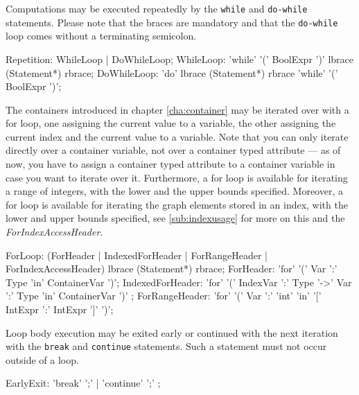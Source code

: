 Computations may be executed repeatedly by the \texttt{while} and \texttt{do-while} statements. Please note that the braces are mandatory and that the \texttt{do-while} loop comes without a terminating semicolon.

\begin{rail} 
  Repetition: WhileLoop | DoWhileLoop;
	WhileLoop: 'while' '(' BoolExpr ')' lbrace (Statement*) rbrace;
	DoWhileLoop: 'do' lbrace (Statement*) rbrace 'while' '(' BoolExpr ')';
\end{rail}


The containers introduced in chapter \ref{cha:container} may be iterated over with a for loop, one assigning the current value to a variable, the other assigning the current index and the current value to a variable.
Note that you can only iterate directly over a container variable, not over a container typed attribute --- as of now, you have to assign a container typed attribute to a container variable in case you want to iterate over it.
Furthermore, a for loop is available for iterating a range of integers, with the lower and the upper bounds specified.
Moreover, a for loop is available for iterating the graph elements stored in an index, with the lower and upper bounds specified, see \ref{sub:indexusage} for more on this and the \emph{ForIndexAccessHeader}.
\begin{rail}
  ForLoop: (ForHeader | IndexedForHeader | ForRangeHeader | ForIndexAccessHeader) lbrace (Statement*) rbrace;
  ForHeader: 'for' '(' Var ':' Type 'in' ContainerVar ')';
  IndexedForHeader: 'for' '(' IndexVar ':' Type '->' Var ':' Type 'in' ContainerVar ')' ;
  ForRangeHeader: 'for' '(' Var ':' 'int' 'in' '[' IntExpr ':' IntExpr ']' ')';
\end{rail}

Loop body execution may be exited early or continued with the next iteration with the \texttt{break} and \texttt{continue} statements. Such a statement must not occur outside of a loop.

\begin{rail} 
  EarlyExit: 
	'break' ';' |	'continue' ';'
	;
\end{rail}

